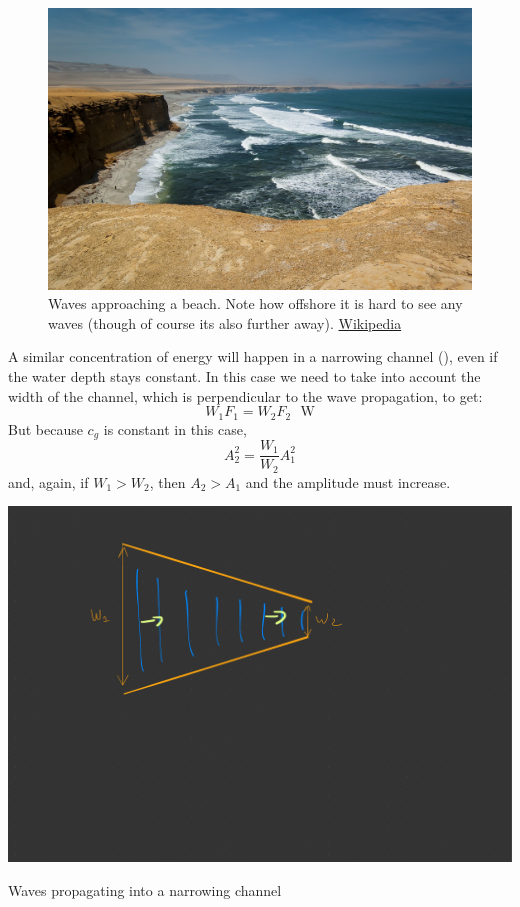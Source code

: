 \begin{figure}[hbt]
  \begin{center}
    \includegraphics{figs/Waves/Paracas_National_Reserve,_Ica,_Peru-3April2011}
    \caption{Waves approaching a beach.  Note how offshore it is hard to see any waves (though of course its also further away).  \href{https://commons.wikimedia.org/w/index.php?title=File:Paracas_National_Reserve,_Ica,_Peru-3April2011.jpg&oldid=414758987}{Wikipedia}}
    \label{fig:ParacasNational}  
  \end{center}
\end{figure}

A similar concentration of energy will happen in a narrowing channel (), even if the water depth stays constant.  In this case we need to take into account the width of the channel, which is perpendicular to the wave propagation, to get:
\begin{equation}
  W_1 F_1 = W_2 F_2\  \ \ \mathrm{W}
\end{equation}
But because $c_g$ is constant in this case,
\begin{equation}
    A_2^2 = \frac{W_1}{W_2} A_1^2   
\end{equation}
and, again, if $W_1 > W_2$, then $A_2 > A_1$ and the amplitude must increase.  

\begin{marginfigure}
    \includegraphics{figs/Waves/NarrowChannel}
    \caption{Waves propagating into a narrowing channel}
    \label{fig:NarrowChannel}  
\end{marginfigure}

